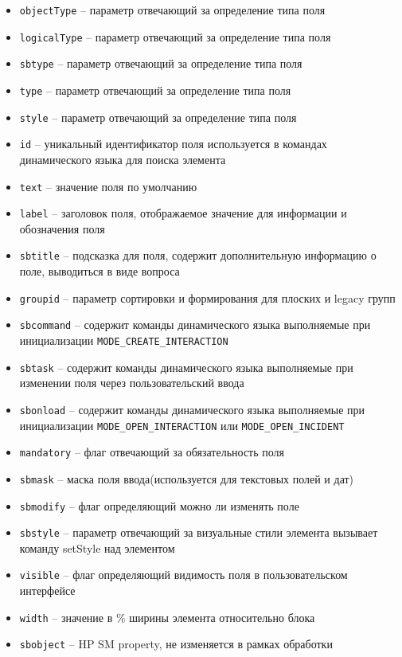 \documentclass[../index.tex]{subfiles}
\begin{document}
\begin{itemize}
	\item \verb|objectType| -- параметр отвечающий за определение типа поля
	\item \verb|logicalType| -- параметр отвечающий за определение типа поля
	\item \verb|sbtype| -- параметр отвечающий за определение типа поля
	\item \verb|type| -- параметр отвечающий за определение типа поля
	\item \verb|style| -- параметр отвечающий за определение типа поля
	\item \verb|id| -- уникальный идентификатор поля используется в командах динамического языка для поиска элемента
	\item \verb|text| -- значение поля по умолчанию
	\item \verb|label| -- заголовок поля, отображаемое значение для информации и обозначения поля
	\item \verb|sbtitle| -- подсказка для поля, содержит дополнительную информацию о поле, выводиться в виде вопроса
	\item \verb|groupid| -- параметр сортировки и формирования для плоских и legacy групп
	\item \verb|sbcommand| -- содержит команды динамического языка выполняемые при инициализации \verb|MODE_CREATE_INTERACTION|
	\item \verb|sbtask| -- содержит команды динамического языка выполняемые при изменении поля через пользовательский ввода
	\item \verb|sbonload| -- содержит команды динамического языка выполняемые при инициализации \verb|MODE_OPEN_INTERACTION| или \verb|MODE_OPEN_INCIDENT|
	\item \verb|mandatory| -- флаг отвечающий за обязательность поля
	\item \verb|sbmask| -- маска поля ввода(используется для текстовых полей и дат)
	\item \verb|sbmodify| -- флаг определяющий можно ли изменять поле
	\item \verb|sbstyle| -- параметр отвечающий за визуальные стили элемента вызывает команду setStyle над элементом
	\item \verb|visible| -- флаг определяющий видимость поля в пользовательском интерфейсе
	\item \verb|width| -- значение в \% ширины элемента относительно блока
	\item \verb|sbobject| -- HP SM property, не изменяется в рамках обработки

\end{itemize}
\end{document}
